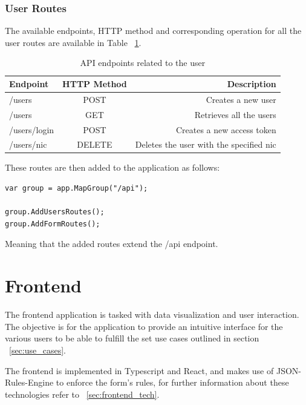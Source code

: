 \subsubsection{User Routes}
The available endpoints, HTTP method and corresponding operation for all the user routes are available in Table ~\ref{tab:user_endpoints}. 

\begin{table}[h!]
	\begin{center}
		\begin{tabular}{l|c|r} 
			\textbf{Endpoint} & \textbf{HTTP Method} & \textbf{Description}\\
			\hline
			/users & POST & Creates a new user\\
			\hline
			/users & GET & Retrieves all the users\\
			\hline
			/users/login & POST & Creates a new access token\\
			\hline
			/users/{nic} & DELETE & Deletes the user with the specified nic\\
			\hline
		\end{tabular}
		\caption{API endpoints related to the user}\label{tab:user_endpoints}
	\end{center}
\end{table}

These routes are then added to the application as follows:

\begin{lstlisting}[style=sharpc]
var group = app.MapGroup("/api");

group.AddUsersRoutes();
group.AddFormRoutes();
\end{lstlisting}

Meaning that the added routes extend the /api endpoint.
\pagebreak

\section{Frontend} \label{frontend}

The frontend application is tasked with data visualization and user interaction. The objective is for the application to provide an intuitive interface for the various users to be able to fulfill the set use cases outlined in section ~\ref{sec:use_cases}.

The frontend is implemented in Typescript and React, and makes use of JSON-Rules-Engine to enforce the form's rules, for further information about these technologies refer to ~\ref{sec:frontend_tech}.

